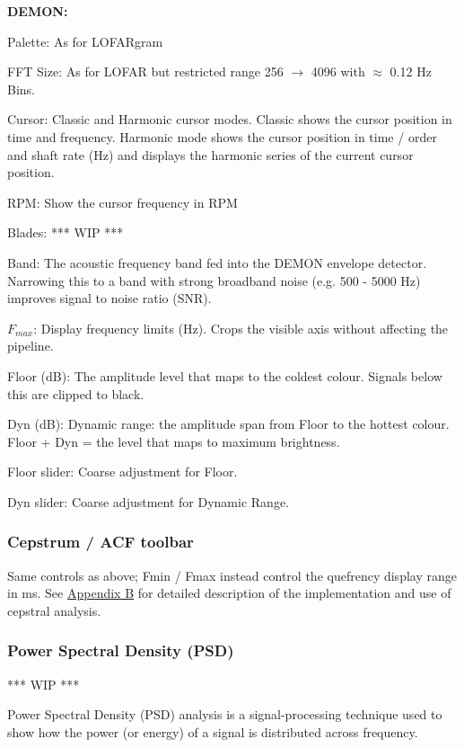 \textbf{DEMON:}

\begin{compactitem}
    \item Palette: As for LOFARgram
    \item FFT Size: As for LOFAR but restricted range 256 $\rightarrow$ 4096 with $\approx$ 0.12 Hz Bins.
    \item Cursor: Classic and Harmonic cursor modes. Classic shows the cursor position in time and frequency. Harmonic mode shows the cursor position in time / order and shaft rate (Hz) and displays the harmonic series of the current cursor position.
    \item RPM: Show the cursor frequency in RPM
    \item Blades: \textcolor{commentGreen}{*** WIP ***}
    \item Band: The acoustic frequency band fed into the DEMON envelope detector. Narrowing this to a band with strong broadband noise (e.g. 500 - 5000 Hz) improves signal to noise ratio (SNR).
    \item $F_{max}$: Display frequency limits (Hz). Crops the visible axis without affecting the pipeline.
    \item Floor (dB): The amplitude level that maps to the coldest colour. Signals below this are clipped to black.
    \item Dyn (dB): Dynamic range: the amplitude span from Floor to the hottest colour. Floor + Dyn = the level that maps to maximum brightness.
    \item Floor slider: Coarse adjustment for Floor.
    \item Dyn slider: Coarse adjustment for Dynamic Range.
\end{compactitem}

\subsubsection{Cepstrum / ACF toolbar}

Same controls as above; Fmin / Fmax instead control the quefrency display range in ms. See \hyperref[sec:Appendix_B]{Appendix B} for detailed description of the implementation and use of cepstral analysis.

\subsubsection{Power Spectral Density (PSD)}
\textcolor{commentGreen}{*** WIP ***}

Power Spectral Density (PSD) analysis is a signal-processing technique used to show how the power (or energy) of a signal is distributed across frequency.


